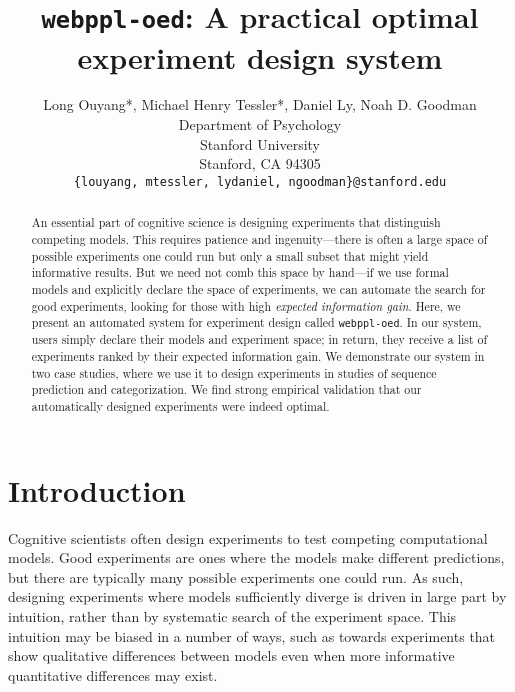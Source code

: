 \documentclass[10pt,letterpaper]{article}
\title{\texttt{webppl-oed}: A practical optimal experiment design system}
\author{
  Long Ouyang*, Michael Henry Tessler*, Daniel Ly, Noah D. Goodman\\
  Department of Psychology\\
  Stanford University\\
  Stanford, CA 94305 \\
  \texttt{\{louyang, mtessler, lydaniel, ngoodman\}@stanford.edu}\\
}
\newcommand{\ndg}[1]{\textcolor{Green}{[ndg: #1]}}
\newcommand{\mht}[1]{\textcolor{Blue}{[mht: #1]}}
\newcommand{\lou}[1]{\textcolor{orange}{[lou: #1]}}
\begin{document}

\maketitle

\begin{abstract}

An essential part of cognitive science is designing experiments that distinguish competing models.
This requires patience and ingenuity---there is often a large space of possible experiments one could run but only a small subset that might yield informative results.
But we need not comb this space by hand---if we use formal models and explicitly declare the space of experiments, we can automate the search for good experiments, looking for those with high \emph{expected information gain}.
Here, we present an automated system for experiment design called \texttt{webppl-oed}.
In our system, users simply declare their models and experiment space; in return, they receive a list of experiments ranked by their expected information gain.
We demonstrate our system in two case studies, where we use it to design experiments in studies of sequence prediction and categorization.
We find strong empirical validation that our automatically designed experiments were indeed optimal.


\end{abstract}


\section{Introduction}
Cognitive scientists often design experiments to test competing computational models.
Good experiments are ones where the models make different predictions, but there are typically many possible experiments one could run.
As such, designing experiments where models sufficiently diverge is driven in large part by intuition, rather than by systematic search of the experiment space.
This intuition may be biased in a number of ways, such as towards experiments that show qualitative differences between models even when more informative quantitative differences may exist.
\end{document}
